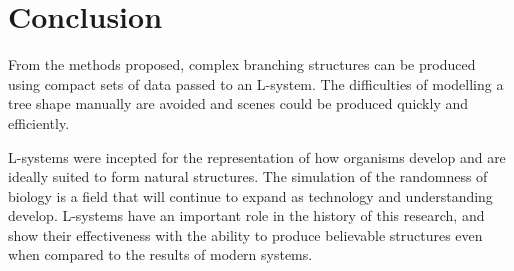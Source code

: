 \documentclass[final]{cmpreport}
\begin{document}
\section{Conclusion}
From the methods proposed, complex branching structures can be produced using compact sets of data 
passed to an L-system. The difficulties of modelling a tree shape manually are avoided and scenes 
could be produced quickly and efficiently.

L-systems were incepted for the representation of how organisms develop and are ideally suited to 
form natural structures. The simulation of the randomness of biology is a field that will continue 
to expand as technology and understanding develop. L-systems have an important role in the history 
of this research, and show their effectiveness with the ability to produce believable structures 
even when compared to the results of modern systems. 

\pagebreak


\pagebreak
\end{document}
